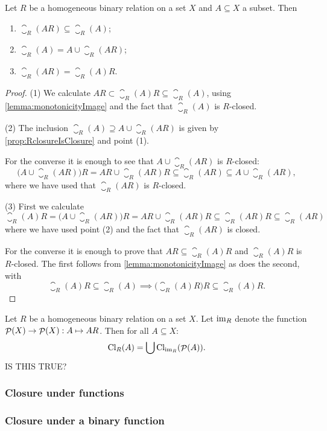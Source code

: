 \begin{lemma}
Let $R$ be a homogeneous binary relation on a set $X$ and $A\subseteq X$ a subset. Then
\begin{enumerate}
\item $\closure_R(AR) \subseteq \closure_R(A)$;
\item $\closure_R(A) = A \cup \closure_R(AR)$;
\item $\closure_R(AR) = \closure_R(A)R$.
\end{enumerate}
\end{lemma}
\begin{proof}
(1) We calculate $AR \subset \closure_R(A)R \subseteq \closure_R(A)$, using \ref{lemma:monotonicityImage} and the fact that $\closure_R(A)$ is $R$-closed.

(2) The inclusion $\closure_R(A) \supseteq A \cup \closure_R(AR)$ is given by \ref{prop:RclosureIsClosure} and point (1).

For the converse it is enough to see that $A \cup \closure_R(AR)$ is $R$-closed:
\[ \big(A \cup \closure_R(AR)\big)R = AR \cup \closure_R(AR)R \subseteq \closure_R(AR) \subseteq A \cup \closure_R(AR), \]
where we have used that $\closure_R(AR)$ is $R$-closed.

(3) First we calculate
\[ \closure_R(A)R = \big(A \cup \closure_R(AR)\big)R = AR \cup \closure_R(AR)R \subseteq \closure_R(AR)R \subseteq \closure_R(AR) \]
where we have used point (2) and the fact that $\closure_R(AR)$ is closed.

For the converse it is enough to prove that $AR \subseteq \closure_R(A)R$ and $\closure_R(A)R$ is $R$-closed. The first follows from \ref{lemma:monotonicityImage} as does the second, with
\[ \closure_R(A)R \subseteq \closure_R(A) \implies \big(\closure_R(A)R\big)R \subseteq \closure_R(A)R. \]
\end{proof}

\begin{lemma}
Let $R$ be a homogeneous binary relation on a set $X$. Let $\operatorname{im}_R$ denote the function $\mathop{\mathcal{P}}(X) \to \mathop{\mathcal{P}}(X): A \mapsto AR$. Then for all $A\subseteq X$:
\[ \operatorname{Cl}_R(A) = \bigcup \operatorname{Cl}_{\operatorname{im}_R}(\mathop{\mathcal{P}}(A)). \]
IS THIS TRUE?
\end{lemma}

\subsubsection{Closure under functions}

\subsubsection{Closure under a binary function}
